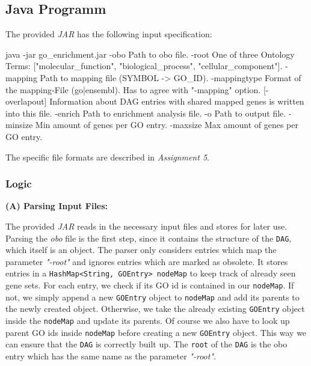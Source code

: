 \documentclass[12pt]{article}
\begin{document}
\newpage
\subsection{Java Programm}\label{sec:Java-Programm}
The provided \textit{JAR} has the following input specification:
\begin{verbatim*}
java -jar go_enrichment.jar
  -obo                   Path to obo file.
  -root                  One of three Ontology Terms:
                         ["molecular_function",
                         "biological_process",
                         "cellular_component"].
  -mapping               Path to mapping file (SYMBOL -> GO_ID).
  -mappingtype           Format of the mapping-File (go|ensembl). 
                         Has to agree with "-mapping" option.
  [-overlapout]          Information about DAG  entries  with shared mapped
                         genes is written into this file.
  -enrich                Path to enrichment analysis file.
  -o                     Path to output file.
  -minsize               Min amount of genes per GO entry.
  -maxsize               Max amount of genes per GO entry.
\end{verbatim*}

The specific file formats are described in \textit{Assignment 5}.
\newpage
\subsubsection{Logic}\label{sec:Logic}
\textbf{(A) Parsing Input Files:}

The provided \textit{JAR} reads in the necessary input files and stores for later use.
Parsing the \textit{obo} file is the first step, since it contains the structure
of the \texttt{DAG}, which itself is an object. The parser only considers entries which map
the parameter \textit{"-root"} and ignores entries which are marked as obsolete.
It stores entries in a \texttt{HashMap<String, GOEntry> nodeMap} to keep 
track of already seen gene sets. For each entry, we check if
its GO id is contained in our \texttt{nodeMap}. If not, we simply append
a new \texttt{GOEntry} object to \texttt{nodeMap} and add its parents 
to the newly created object. Otherwise, we take the already existing \texttt{GOEntry} 
object inside the \texttt{nodeMap} and update its parents. 
Of course we also have to look up parent GO ids inside \texttt{nodeMap}
before creating a new \texttt{GOEntry} object. This way we can ensure that 
the \texttt{DAG} is correctly built up. The \texttt{root} of the \texttt{DAG} is
the obo entry which has the same name as the parameter \textit{"-root"}.
\end{document}
